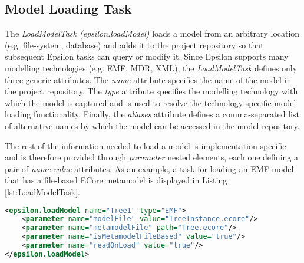 \subsection{Model Loading Task}

The \textit{LoadModelTask (epsilon.loadModel)} loads a model from an arbitrary location (e.g. file-system, database) and adds it to the project repository so that subsequent Epsilon tasks can query or modify it. Since Epsilon supports many modelling technologies (e.g. EMF, MDR, XML), the \textit{LoadModelTask} defines only three generic attributes. The \textit{name} attribute specifies the name of the model in the project repository. The \textit{type} attribute specifies the modelling technology with which the model is captured and is used to resolve the technology-specific model loading functionality. Finally, the \textit{aliases} attribute defines a comma-separated list of alternative names by which the model can be accessed in the model repository.

The rest of the information needed to load a model is implementation-specific and is therefore provided through \textit{parameter} nested elements, each one defining a pair of \textit{name}-\textit{value} attributes. As an example, a task for loading an EMF model that has a file-based ECore metamodel is displayed in Listing \ref{lst:LoadModelTask}.

\begin{lstlisting}[basicstyle=\ttfamily\footnotesize, nolol=true, flexiblecolumns=true, caption=Loading an EMF model using the epsilon.loadModel task, label=lst:LoadModelTask, language=XML]
<epsilon.loadModel name="Tree1" type="EMF">
	<parameter name="modelFile" value="TreeInstance.ecore"/>
	<parameter name="metamodelFile" path="Tree.ecore"/>
	<parameter name="isMetamodelFileBased" value="true"/>
	<parameter name="readOnLoad" value="true"/>
</epsilon.loadModel>
\end{lstlisting}
